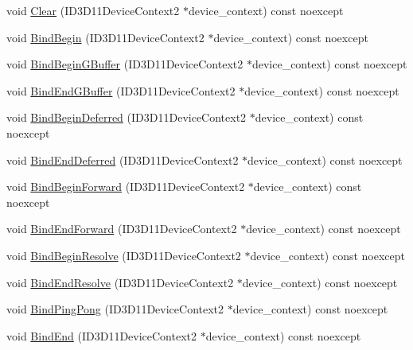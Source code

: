 \begin{DoxyCompactItemize}
\item 
void \hyperlink{classmage_1_1_rendering_output_manager_ab1c047e436dd77b032dedd3958c28414}{Clear} (I\+D3\+D11\+Device\+Context2 $\ast$device\+\_\+context) const noexcept
\item 
void \hyperlink{classmage_1_1_rendering_output_manager_a6b4feb9065e783da578670ee76b9eef1}{Bind\+Begin} (I\+D3\+D11\+Device\+Context2 $\ast$device\+\_\+context) const noexcept
\item 
void \hyperlink{classmage_1_1_rendering_output_manager_ac70991c338dde28a1e37f37259c309f6}{Bind\+Begin\+G\+Buffer} (I\+D3\+D11\+Device\+Context2 $\ast$device\+\_\+context) const noexcept
\item 
void \hyperlink{classmage_1_1_rendering_output_manager_ae304cfa194a46a82fb0e2deef68d7915}{Bind\+End\+G\+Buffer} (I\+D3\+D11\+Device\+Context2 $\ast$device\+\_\+context) const noexcept
\item 
void \hyperlink{classmage_1_1_rendering_output_manager_a2f4c24f11b7a1821e3d73d94d1147f56}{Bind\+Begin\+Deferred} (I\+D3\+D11\+Device\+Context2 $\ast$device\+\_\+context) const noexcept
\item 
void \hyperlink{classmage_1_1_rendering_output_manager_a1572b24b1cc7b4344717af581d04fd75}{Bind\+End\+Deferred} (I\+D3\+D11\+Device\+Context2 $\ast$device\+\_\+context) const noexcept
\item 
void \hyperlink{classmage_1_1_rendering_output_manager_a599522abd660e0bf497c0d9066c5dbbe}{Bind\+Begin\+Forward} (I\+D3\+D11\+Device\+Context2 $\ast$device\+\_\+context) const noexcept
\item 
void \hyperlink{classmage_1_1_rendering_output_manager_a48f4a463e23f0b80f5567919c54b0a6b}{Bind\+End\+Forward} (I\+D3\+D11\+Device\+Context2 $\ast$device\+\_\+context) const noexcept
\item 
void \hyperlink{classmage_1_1_rendering_output_manager_afd4cc1caabf0e0aaff006a8068da46c1}{Bind\+Begin\+Resolve} (I\+D3\+D11\+Device\+Context2 $\ast$device\+\_\+context) const noexcept
\item 
void \hyperlink{classmage_1_1_rendering_output_manager_afbcb1ae5b8d912a509902ab8d2b7fdbe}{Bind\+End\+Resolve} (I\+D3\+D11\+Device\+Context2 $\ast$device\+\_\+context) const noexcept
\item 
void \hyperlink{classmage_1_1_rendering_output_manager_ac27d156cacfe09e31e4c6867d45ee3f8}{Bind\+Ping\+Pong} (I\+D3\+D11\+Device\+Context2 $\ast$device\+\_\+context) const noexcept
\item 
void \hyperlink{classmage_1_1_rendering_output_manager_adea6f5c57a7f817984380fb82b6a8f64}{Bind\+End} (I\+D3\+D11\+Device\+Context2 $\ast$device\+\_\+context) const noexcept
\end{DoxyCompactItemize}
